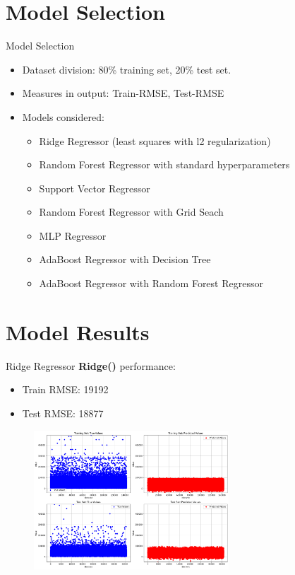 \documentclass{beamer}
\begin{document}
\section{Model Selection}
\begin{frame}{Model Selection}
    \begin{itemize}
        \item Dataset division: 80\% training set, 20\% test set.
        \item Measures in output: Train-RMSE, Test-RMSE
        \item Models considered:
            \begin{itemize}
                \item Ridge Regressor (least squares with l2 regularization)
                \item Random Forest Regressor with standard hyperparameters
                \item Support Vector Regressor
                \item Random Forest Regressor with Grid Seach
                \item MLP Regressor
                \item AdaBoost Regressor with Decision Tree
                \item AdaBoost Regressor with Random Forest Regressor
            \end{itemize}
    \end{itemize}
\end{frame}

\section{Model Results}
\begin{frame}{Ridge Regressor}
\textbf{Ridge()} performance:
        \begin{itemize}
            \item Train RMSE: 19192
            \item Test RMSE: 18877
        \end{itemize}
    \begin{figure}
        \centering
        \includegraphics[width=0.65\textwidth]{images/ridge_plot2.png}
    \end{figure}
\end{frame}
\end{document}
